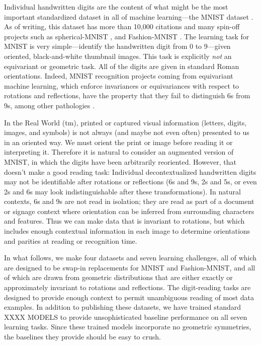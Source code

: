 \documentclass{article}
\begin{document}
Individual handwritten digits are the content of what might be the most important standardized dataset in all of machine learning---the MNIST dataset \cite{mnist}.
As of writing, this dataset has more than 10,000 citations and many spin-off projects such as spherical-MNIST \cite{spherical}, and Fashion-MNIST \cite{fashion}.
The learning task for MNIST is very simple---identify the handwritten digit from 0 to 9---given oriented, black-and-white thumbnail images.
This task is explicitly \emph{not} an equivariant or geometric task.
All of the digits are given in standard Roman orientations.
Indeed, MNIST recognition projects coming from equivariant machine learning, which enforce invariances or equivariances with respect to rotations and reflections, have the property that they fail to distinguish 6s from 9s, among other pathologies \cite{something}.

In the Real World (tm), printed or captured visual information (letters, digits, images, and symbols) is not always (and maybe not even often) presented to us in an oriented way.
We must orient the print or image before reading it or interpreting it.
Therefore it is natural to consider an augmented version of MNIST, in which the digits have been arbitrarily reoriented.
However, that doesn't make a good reading task:
Individual decontextualized handwritten digits may not be identifiable after rotations or reflections (6s and 9s, 2s and 5s, or even 2s and 6s may look indistinguishable after these transformations).
In natural contexts, 6s and 9s are not read in isolation; they are read as part of a document or signage context where orientation can be inferred from surrounding characters and features.
Thus we can make data that is invariant to rotations, but which includes enough contextual information in each image to determine orientations and parities at reading or recognition time.

In what follows, we make four datasets and seven learning challenges, all of which are designed to be swap-in replacements for MNIST and Fashion-MNIST, and all of which are drawn from geometric distributions that are either exactly or approximately invariant to rotations and reflections.
The digit-reading tasks are designed to provide enough context to permit unambiguous reading of most data examples.
In addition to publishing these datasets, we have trained standard XXXX MODELS to provide unsophisticated baseline performance on all seven learning tasks.
Since these trained models incorporate no geometric symmetries, the baselines they provide should be easy to crush.
\end{document}
